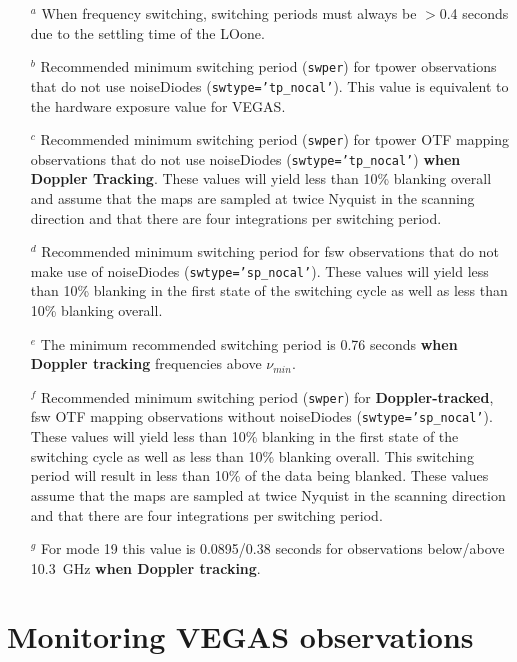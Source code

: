 \begin{footnotesize}
\begin{itemize}[itemsep=0pt]
\item[$^a$] When frequency switching, switching periods must always be $>$0.4 seconds
due to the settling time of the \gls{LOone}.
\item[$^b$] Recommended minimum switching period ({\tt swper}) for \gls{tpower}
observations that do not use \glspl{noiseDiode} ({\tt swtype='tp\_nocal'}).
This value is equivalent to the hardware exposure value for VEGAS.
\item[$^c$] Recommended minimum switching period ({\tt swper}) for
\gls{tpower} \gls{OTF} mapping observations that do not use \glspl{noiseDiode}
({\tt swtype='tp\_nocal'}) {\bf when Doppler Tracking}. These values will yield less
than 10\% blanking overall and assume that the maps are sampled at twice Nyquist in
the scanning direction and that there are four integrations per switching period.
\item[$^d$] Recommended minimum switching period for \gls{fsw} observations that do not
make use of \glspl{noiseDiode} ({\tt swtype='sp\_nocal'}). These values will yield less than
10\% blanking in the first state of the switching cycle as well as less than 10\% blanking overall.
\item[$^e$] The minimum recommended switching period is 0.76 seconds {\bf when Doppler tracking}
frequencies above $\nu_{min}$.
\item[$^f$] Recommended minimum switching period ({\tt swper}) for {\bf Doppler-tracked}, \gls{fsw}
\gls{OTF} mapping observations without \glspl{noiseDiode} ({\tt swtype='sp\_nocal'}). These values
will yield less than 10\% blanking in the first state of the switching cycle as well as less
than 10\% blanking overall.  This switching period will result in less than 10\% of the
data being blanked. These values assume that the maps are sampled at twice Nyquist in the
scanning direction and that there are four integrations per switching period.
\item[$^g$] For mode 19 this value is 0.0895/0.38 seconds for observations below/above 10.3~GHz
{\bf when Doppler tracking}.
\end{itemize}
\end{footnotesize}
\newpage





\section{Monitoring VEGAS observations}\label{sec:vegas_monitoring}

